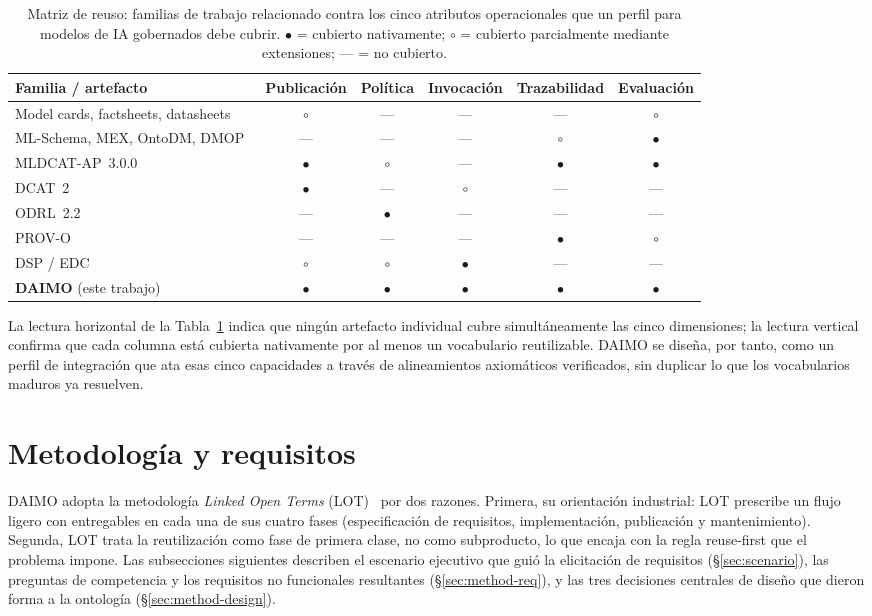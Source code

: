 \documentclass[Afour,sagev,times]{sagej}
\begin{document}
\begin{table}[t]
\small\sf\centering
\caption{Matriz de reuso: familias de trabajo relacionado contra los cinco atributos operacionales que un perfil para modelos de IA gobernados debe cubrir. $\bullet$ = cubierto nativamente; $\circ$ = cubierto parcialmente mediante extensiones; --- = no cubierto.\label{tab:reuse-matrix}}
\begin{tabular}{@{}lccccc@{}}
\toprule
\textbf{Familia / artefacto} & \textbf{Publicación} & \textbf{Política} & \textbf{Invocación} & \textbf{Trazabilidad} & \textbf{Evaluación} \\
\midrule
Model cards, factsheets, datasheets~\cite{mitchell19,arnold19,gebru21} & $\circ$ & --- & --- & --- & $\circ$ \\
ML-Schema, MEX, OntoDM, DMOP~\cite{mls,mex,ontodm,dmop} & --- & --- & --- & $\circ$ & $\bullet$ \\
MLDCAT-AP~3.0.0~\cite{mldcatap} & $\bullet$ & $\circ$ & --- & $\bullet$ & $\bullet$ \\
DCAT~2~\cite{dcat2} & $\bullet$ & --- & $\circ$ & --- & --- \\
ODRL~2.2~\cite{odrl22} & --- & $\bullet$ & --- & --- & --- \\
PROV-O~\cite{provo} & --- & --- & --- & $\bullet$ & $\circ$ \\
DSP / EDC~\cite{dsp,edc} & $\circ$ & $\circ$ & $\bullet$ & --- & --- \\
\midrule
\textbf{DAIMO} (este trabajo) & $\bullet$ & $\bullet$ & $\bullet$ & $\bullet$ & $\bullet$ \\
\bottomrule
\end{tabular}
\end{table}

La lectura horizontal de la Tabla~\ref{tab:reuse-matrix} indica que ningún artefacto individual cubre simultáneamente las cinco dimensiones; la lectura vertical confirma que cada columna está cubierta nativamente por al menos un vocabulario reutilizable. DAIMO se diseña, por tanto, como un perfil de integración que ata esas cinco capacidades a través de alineamientos axiomáticos verificados, sin duplicar lo que los vocabularios maduros ya resuelven.

\section{Metodología y requisitos}\label{sec:method}

DAIMO adopta la metodología \emph{Linked Open Terms} (LOT)~\cite{lot22} por dos razones. Primera, su orientación industrial: LOT prescribe un flujo ligero con entregables en cada una de sus cuatro fases (especificación de requisitos, implementación, publicación y mantenimiento). Segunda, LOT trata la reutilización como fase de primera clase, no como subproducto, lo que encaja con la regla reuse-first que el problema impone. Las subsecciones siguientes describen el escenario ejecutivo que guió la elicitación de requisitos (§\ref{sec:scenario}), las preguntas de competencia y los requisitos no funcionales resultantes (§\ref{sec:method-req}), y las tres decisiones centrales de diseño que dieron forma a la ontología (§\ref{sec:method-design}).
\end{document}
